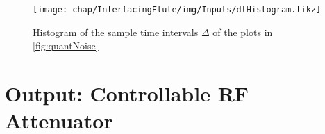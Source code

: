 \begin{figure}[tb]
\centering
\texttt{[image: chap/InterfacingFlute/img/Inputs/dtHistogram.tikz]}
\caption{Histogram of the sample time intervals $\Delta$ of the plots in \autoref{fig:quantNoise}}
\label{fig:sampleTimesHist}
\end{figure}

\section{Output: Controllable RF Attenuator}